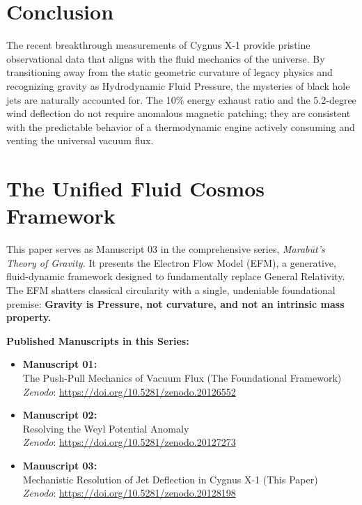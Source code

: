 \documentclass[11pt, a4paper]{article}
\begin{document}
\section{Conclusion}
The recent breakthrough measurements of Cygnus X-1 provide pristine observational data that aligns with the fluid mechanics of the universe. By transitioning away from the static geometric curvature of legacy physics and recognizing gravity as Hydrodynamic Fluid Pressure, the mysteries of black hole jets are naturally accounted for. The 10\% energy exhaust ratio and the 5.2-degree wind deflection do not require anomalous magnetic patching; they are consistent with the predictable behavior of a thermodynamic engine actively consuming and venting the universal vacuum flux.

\clearpage
\section*{The Unified Fluid Cosmos Framework}
  This paper serves as Manuscript 03 in the comprehensive series, \textit{Marab\={u}t's Theory of Gravity}. It presents the Electron Flow Model (EFM), a generative, fluid-dynamic framework designed to fundamentally replace General Relativity. The EFM shatters classical circularity with a single, undeniable foundational premise: \textbf{Gravity is Pressure, not curvature, and not an intrinsic mass property.}

  \vspace{1em}
  \noindent \textbf{Published Manuscripts in this Series:}
  \begin{itemize}
    \item \textbf{Manuscript 01:} \\ The Push-Pull Mechanics of Vacuum Flux (The Foundational Framework) \\ \textit{Zenodo}: \url{https://doi.org/10.5281/zenodo.20126552}
    
    \item \textbf{Manuscript 02:} \\ Resolving the Weyl Potential Anomaly \\ \textit{Zenodo}: \url{https://doi.org/10.5281/zenodo.20127273}

    \item \textbf{Manuscript 03:} \\ Mechanistic Resolution of Jet Deflection in Cygnus X-1 (This Paper) \\ \textit{Zenodo}: \url{https://doi.org/10.5281/zenodo.20128198}
  \end{itemize}
\end{document}
